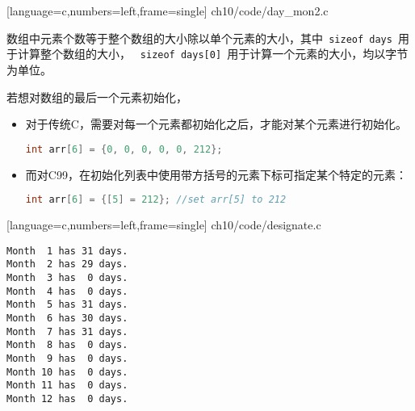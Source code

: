 \begin{frame}[fragile]

[language=c,numbers=left,frame=single]
{ch10/code/day_mon2.c}
\end{frame}

\begin{frame}[fragile]
  数组中元素个数等于整个数组的大小除以单个元素的大小，其中\lstinline| sizeof days |用于计算整个数组的大小，
  \lstinline| sizeof days[0] |用于计算一个元素的大小，均以字节为单位。
\end{frame}

\begin{frame}[fragile]
若想对数组的最后一个元素初始化，\vspace{0.1in}

\begin{itemize}
\item 
对于传统C，需要对每一个元素都初始化之后，才能对某个元素进行初始化。
\begin{lstlisting}[language=c,backgroundcolor=\color{red!20}]
  int arr[6] = {0, 0, 0, 0, 0, 212};
\end{lstlisting}
\pause\vspace{0.1in}

\item 
而对C99，在初始化列表中使用带方括号的元素下标可指定某个特定的元素：
\begin{lstlisting}[language=c,backgroundcolor=\color{red!20}]
int arr[6] = {[5] = 212}; //set arr[5] to 212
\end{lstlisting}
\end{itemize}
\end{frame}

\begin{frame}[fragile]

[language=c,numbers=left,frame=single]
{ch10/code/designate.c}
\end{frame}

\begin{frame}[fragile]
\begin{lstlisting}[backgroundcolor=\color{red!20}]
Month  1 has 31 days.
Month  2 has 29 days.
Month  3 has  0 days.
Month  4 has  0 days.
Month  5 has 31 days.
Month  6 has 30 days.
Month  7 has 31 days.
Month  8 has  0 days.
Month  9 has  0 days.
Month 10 has  0 days.
Month 11 has  0 days.
Month 12 has  0 days.
\end{lstlisting}
\end{frame}

